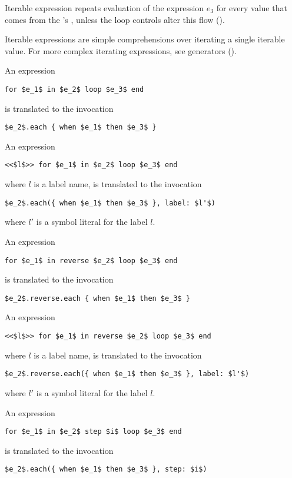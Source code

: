 Iterable expression repeats evaluation of the expression $e_3$ for every value that comes from the 's , unless the loop controls alter this flow ().

Iterable expressions are simple comprehensions over iterating a single iterable value. For more complex iterating expressions, see generators ().

An expression 
\begin{lstlisting}
for $e_1$ in $e_2$ loop $e_3$ end
\end{lstlisting} 
is translated to the invocation
\begin{lstlisting}
$e_2$.each { when $e_1$ then $e_3$ }
\end{lstlisting} 

An expression 
\begin{lstlisting}
<<$l$>> for $e_1$ in $e_2$ loop $e_3$ end
\end{lstlisting} 
where $l$ is a label name, is translated to the invocation
\begin{lstlisting}[deletekeywords={label}]
$e_2$.each({ when $e_1$ then $e_3$ }, label: $l'$)
\end{lstlisting}
where $l'$ is a symbol literal for the label $l$. 

An expression 
\begin{lstlisting}
for $e_1$ in reverse $e_2$ loop $e_3$ end
\end{lstlisting} 
is translated to the invocation
\begin{lstlisting}[deletekeywords={reverse}]
$e_2$.reverse.each { when $e_1$ then $e_3$ }
\end{lstlisting} 

An expression 
\begin{lstlisting}
<<$l$>> for $e_1$ in reverse $e_2$ loop $e_3$ end
\end{lstlisting} 
where $l$ is a label name, is translated to the invocation
\begin{lstlisting}[deletekeywords={label,reverse}]
$e_2$.reverse.each({ when $e_1$ then $e_3$ }, label: $l'$)
\end{lstlisting}
where $l'$ is a symbol literal for the label $l$. 

An expression 
\begin{lstlisting}
for $e_1$ in $e_2$ step $i$ loop $e_3$ end
\end{lstlisting} 
is translated to the invocation
\begin{lstlisting}[deletekeywords={step}]
$e_2$.each({ when $e_1$ then $e_3$ }, step: $i$)
\end{lstlisting} 

